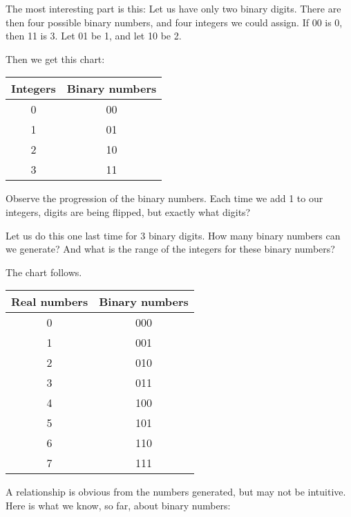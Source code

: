 \documentclass[12pt]{article}
\begin{document}
    The most interesting part is this: Let us have only two binary digits. There
    are then four possible binary numbers, and four integers
    we could assign. If 00 is 0, then 11 is 3. Let 01 be 1, and let
    10 be 2.

    Then we get this chart:

    \begin{center}
        \begin{tabular}{|c|c|}
          \hline
          Integers & Binary numbers \\
          \hline
          0 & 00 \\
          1 & 01 \\
          2 & 10 \\
          3 & 11 \\         
          \hline
                     
        \end{tabular}
    \end{center}

    Observe the progression of the binary numbers. Each time we add 1 to our integers, digits
    are being flipped, but exactly what digits?

    Let us do this one last time for 3 binary digits. How many binary numbers can we generate?
    And what is the range of the integers for these binary numbers?

    The chart follows.

        \begin{center}
        \begin{tabular}{|c|c|}
          \hline
          Real numbers & Binary numbers \\
          \hline
          0 & 000 \\
          1 & 001 \\
          2 & 010  \\
          3 & 011 \\
          4 & 100 \\
          5 & 101 \\
          6 & 110 \\
          7 & 111 \\
          \hline
                     
        \end{tabular}
    \end{center}

    A relationship is obvious from the numbers generated, but may not be intuitive.
    Here is what we know, so far, about binary numbers:
\end{document}

